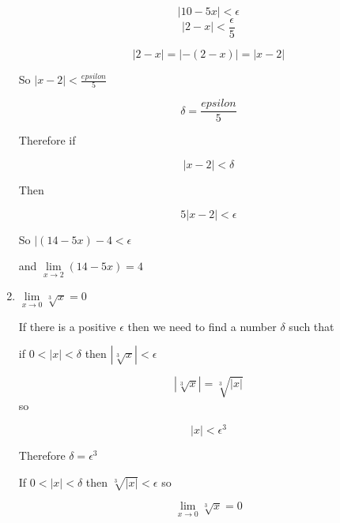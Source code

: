 \documentclass{article}
\begin{document}
\begin{enumerate}
			$$|10 - 5x| < \epsilon$$
			$$|2 - x| < \frac{\epsilon}{5}$$

			$$|2-x| = |-(2-x)| = |x-2|$$

			So $|x - 2| < \frac{epsilon}{5}$

			$$\delta = \frac{epsilon}{5}$$

			Therefore if

			$$|x-2| < \delta$$

			Then

			$$5|x-2| < \epsilon$$

			So $|(14 - 5x) -4 < \epsilon$

			and $\lim \limits _{x \to 2} (14 - 5x) = 4$	

		\item $\lim \limits _{x \to 0} \sqrt[3]{x} = 0$

			If there is a positive $\epsilon$ then we need to find
			a number $\delta$ such that

			if $0 < |x| < \delta$ then $|\sqrt[3]{x}| < \epsilon$

			$$|\sqrt[3]{x}| = \sqrt[3]{|x|}$$ so

			$$|x| < \epsilon^3$$

			Therefore $ \delta = \epsilon^3$

			If $0 < |x| < \delta$ then $\sqrt[3]{|x|} < \epsilon$ so 

			$$\lim \limits _{x \to 0} \sqrt[3]{x} = 0$$

	\end{enumerate}
\end{document}
